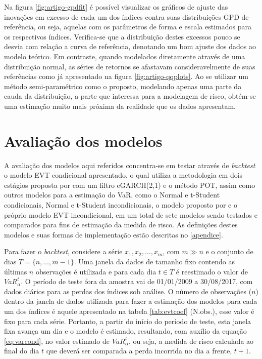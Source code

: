 \documentclass[1p]{elsarticle}
\theoremstyle{definition}
\begin{document}
	

Na figura \ref{fig:artigo-gpdfit} é possível visualizar os gráficos de ajuste das inovações em excesso de cada um dos índices contra suas distribuições GPD de referência, ou seja, aquelas com os parâmetros de forma e escala estimados para os respectivos índices. Verifica-se que a distribuição destes excessos pouco se desvia com relação a curva de referência, denotando um bom ajuste dos dados ao modelo teórico. Em contraste, quando modelados diretamente através de uma distribuição normal, as séries de retornos se afastavam consideravelmente de suas referências como já apresentado na figura \ref{fig:artigo-qqplots}. Ao se utilizar um método semi-paramétrico como o proposto, modelando apenas uma parte da cauda da distribuição, a parte que interessa para a modelagem de risco, obtém-se uma estimação muito mais próxima da realidade que os dados apresentam.

\section{Avaliação dos modelos}
\label{sec:avaliacao}

A avaliação dos modelos aqui referidos concentra-se em testar através de \emph{backtest} o modelo EVT condicional apresentado, o qual utiliza a metodologia em dois estágios proposta por \cite{McNeil2000} com um filtro eGARCH(2,1) e o método POT, assim como outros modelos para a estimação do VaR, como o Normal e t-Student condicionais, Normal e t-Student incondicionais, o modelo proposto por \cite{RiskMetrics1995} e o próprio modelo EVT incondicional, em um total de sete modelos sendo testados e comparados para fins de estimação da medida de risco. As definições destes modelos e suas formas de implementação estão descritas no \ref{apendice}.

Para fazer o \emph{backtest}, considere a série $x_1, x_2, \ldots, x_m$, com $m\gg n$ e o conjunto de dias $T = \{n, \ldots, m-1\}$. Uma janela da dados de tamanho fixo contendo as últimas $n$ observações é utilizada e para cada dia $t \in T$ é reestimado o valor de $VaR^t_\alpha$. O período de teste fora da amostra vai de 01/01/2009 a 30/08/2017, com dados diários para as perdas dos índices sob análise. O número de observações ($n$) dentro da janela de dados utilizada para fazer a estimação dos modelos para cada um dos índices é aquele apresentado na tabela \ref{tab:evtcoef} (N.obs.), esse valor é fixo para cada série. Portanto, a partir do início do período de teste, esta janela fixa avança um dia e o modelo é estimado, resultando, com auxílio da equação \eqref{eq:varcond}, no valor estimado de $VaR_\alpha^t$, ou seja, a medida de risco calculada ao final do dia $t$ que deverá ser comparada a perda incorrida no dia a frente, $t+1$.
\end{document}
